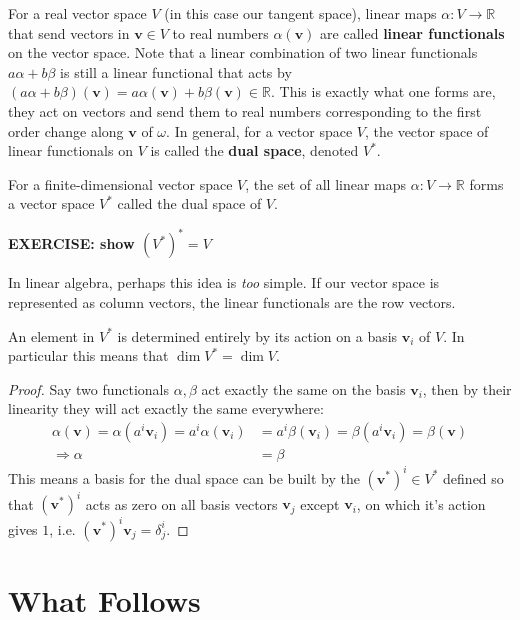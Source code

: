 	For a real vector space $V$ (in this case our tangent space), linear maps $\alpha: V \rightarrow \mathbb R$ that send vectors in $\mathbf v \in V$ to real numbers $\alpha(\mathbf v)$ are called \textbf{linear functionals} on the vector space. Note that a linear combination of two linear functionals $a \alpha + b \beta$ is still a linear functional that acts by $(a \alpha + b \beta)(\mathbf v) = a \alpha(\mathbf v) + b \beta(\mathbf v) \in \mathbb R$. This is exactly what one forms are, they act on vectors and send them to real numbers corresponding to the first order change along $\mathbf v$ of $\omega$. In general, for a vector space $V$, the vector space of linear functionals on $V$ is called the \textbf{dual space}, denoted $V^*$.
	\begin{defn}
		For a finite-dimensional vector space $V$, the set of all linear maps $\alpha: V \rightarrow \mathbb R$ forms a vector space $V^*$ called the dual space of $V$. 
	\end{defn}
	\textbf{EXERCISE: show $(V^*)^*=V$}
	
	In linear algebra, perhaps this idea is \emph{too} simple. If our vector space is represented as column vectors, the linear functionals are the row vectors.
	
	\begin{prop}
		An element in $V^*$ is determined entirely by its action on a basis $\mathbf v_i$ of $V$. In particular this means that $\dim V^* = \dim V$.
	\end{prop}
	\begin{proof}
		Say two functionals $\alpha, \beta$ act exactly the same on the basis $\mathbf v_i$, then by their linearity they will act exactly the same everywhere: 
		\begin{align*}
			\alpha(\mathbf v)= \alpha(a^i \mathbf v_i) = a^i \alpha(\mathbf v_i) &= a^i \beta(\mathbf v_i)= \beta(a^i \mathbf v_i) = \beta(\mathbf v)\\
			\Rightarrow \alpha &= \beta
		\end{align*}
		This means a basis for the dual space can be built by the $(\mathbf v^*)^i \in V^*$ defined so that $(\mathbf v^*)^i$ acts as zero on all basis vectors $\mathbf v_j$ except $\mathbf v_i$, on which it's action gives $1$, i.e. $(\mathbf v^*)^i \mathbf v_j = \delta^i_j$. 
	\end{proof}
	
	\section{What Follows} %
	\label{sec:what_follows}
	
